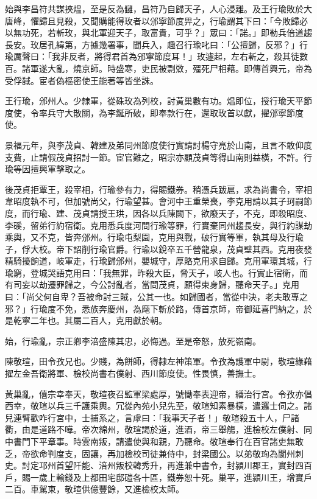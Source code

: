 \begin{pinyinscope}
 始與李昌符共謀挾煴，至是反為讎，昌符乃自歸天子，人心浸離。及王行瑜敗於大唐峰，懼歸且見殺，又聞購能得玫者以邠寧節度畀之，行瑜謂其下曰：「今敗歸必以無功死，若斬玫，與北軍迎天子，取富貴，可乎？」眾曰：「諾。」即勒兵倍道趨長安。玫居孔緯第，方據幾署事，聞兵入，趣召行瑜叱曰：「公擅歸，反邪？」行瑜厲聲曰：「我非反者，將得君首為邠寧節度耳！」玫遽起，左右斬之，殺其徒數百。諸軍遂大亂，燒京師。時盛寒，吏民被剽敚，殭死尸相藉。即傳首興元，帝為受俘馘。宦者偽樞密使王能著等皆坐誅。



 王行瑜，邠州人。少隸軍，從硃玫為列校，討黃巢數有功。煴即位，授行瑜天平節度使，令率兵守大散關，為李鋋所破，即奉款行在，還取玫首以獻，擢邠寧節度使。



 景福元年，與李茂貞、韓建及弟同州節度使行實請討楊守亮於山南，且言不敢仰度支費，止請假茂貞招討一節。宦官難之，昭宗亦顧茂貞等得山南則益橫，不許。行瑜等因擅興軍擊取之。



 後茂貞拒覃王，殺宰相，行瑜參有力，得賜鐵券。稍憑兵跋扈，求為尚書令，宰相韋昭度執不可，但加號尚父，行瑜望甚。會河中王重榮喪，李克用請以其子珂嗣節度，而行瑜、建、茂貞請授王珙，因各以兵陳闕下，欲廢天子，不克，即殺昭度、李磎，留弟行約宿衛。克用悉兵度河問行瑜等罪，行實棄同州趨長安，與行約謀劫乘輿，又不克，皆奔邠州。行瑜屯梨園，克用與戰，破行實等軍，執其母及行瑜子，俘大校。帝下詔削行瑜官爵。行瑜以銳卒五千營龍泉，茂貞壁其西。克用夜發精騎擾餉道，岐軍走，行瑜歸邠州，嬰城守，厚賂克用求自歸。克用軍環其城，行瑜窮，登城哭語克用曰：「我無罪，昨殺大臣，脅天子，岐人也。行實止宿衛，而有司妄以劫遷罪歸之，今公討亂者，當問茂貞，願得束身歸，聽命天子。」克用曰：「尚父何自卑？吾被命討三賊，公其一也。如歸國者，當從中決，老夫敢專之邪？」行瑜度不免，悉族奔慶州，為麾下斬於路，傳首京師，帝御延喜門納之，於是乾寧二年也。其屬二百人，克用獻於朝。



 始，行瑜亂，宗正卿李涪盛陳其忠，必悔過。至是帝怒，放死嶺南。



 陳敬瑄，田令孜兄也。少賤，為餅師，得隸左神策軍。令孜為護軍中尉，敬瑄緣藉擢左金吾衛將軍、檢校尚書右僕射、西川節度使。性畏慎，善撫士。



 黃巢亂，僖宗幸奉天，敬瑄夜召監軍梁處厚，號慟奉表迎帝，繕治行宮。令孜亦倡西幸，敬瑄以兵三千護乘輿。冗從內苑小兒先至，敬瑄知素暴橫，遣邏士伺之。諸兒連臂歡咋行宮中，士捕系之，言虖曰：「我事天子者！」敬瑄殺五十人，尸諸衢，由是道路不嘩。帝次綿州，敬瑄謁於道，進酒，帝三舉觴，進檢校左僕射、同中書門下平章事。時雲南叛，請遣使與和親，乃聽命。敬瑄奉行在百官諸吏無敢乏，帝欲命判度支，固讓，再加檢校司徒兼侍中，封梁國公。以弟敬珣為閬州刺史。討定邛州首望阡能、涪州叛校韓秀升，再進兼中書令，封潁川郡王，實封四百戶，賜一歲上輸錢及上都田宅邸磑各十區，鐵券恕十死。巢平，進潁川王，增實戶二百。車駕東，敬瑄供億豐餘，又進檢校太師。




\end{pinyinscope}
